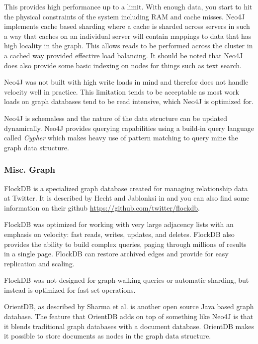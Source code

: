 \documentclass[]{article}
\begin{document}
This provides high performance up to a limit. With enough data, you start to hit the physical constraints of the system including RAM and cache misses. Neo4J implements cache based sharding where a cache is sharded across servers in such a way that caches on an individual server will contain mappings to data that has high locality in the graph. This allows reads to be performed across the cluster in a cached way provided effective load balancing. It should be noted that Neo4J does also provide some basic indexing on nodes for things such as text search.

Neo4J was not built with high write loads in mind and therefor does not handle velocity well in practice. This limitation tends to be acceptable as most work loads on graph databases tend to be read intensive, which Neo4J is optimized for. 

Neo4J is schemaless and the nature of the data structure can be updated dynamically\cite{sharma_extended_2015}. Neo4J provides querying capabilities using a build-in query language called \textit{Cypher} which makes heavy use of pattern matching to query mine the graph data structure.

\subsubsection{Misc. Graph}\label{sssec:misc-graph}
FlockDB is a specialized graph database created for managing relationship data at Twitter. It is described by Hecht and Jablonksi in \cite{hecht_nosql_2011} and you can also find some information on their github \url{https://github.com/twitter/flockdb}.

FlockDB was optimized for working with very large adjacency lists with an emphasis on velocity: fast reads, writes, updates, and deletes. FlockDB also provides the ability to build complex queries, paging through millions of results in a single page. FlockDB can restore archived edges and provide for easy replication and scaling. 

FlockDB was not designed for graph-walking queries or automatic sharding, but instead is optimized for fast set operations.

OrientDB, as described by Sharma et al.\cite{sharma_extended_2015} is another open source Java based graph database. The feature that OrientDB adds on top of something like Neo4J is that it blends traditional graph databases with a document database. OrientDB makes it possible to store documents as nodes in the graph data structure.
\end{document}

